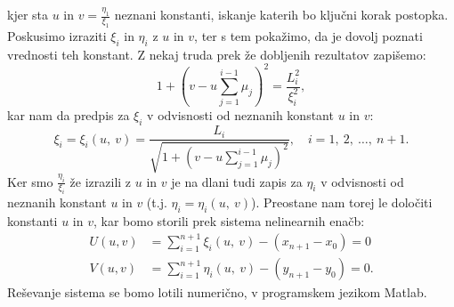 \documentclass{article}
\begin{document}
kjer sta $u$ in $v= \frac{\eta_{1}}{\xi_{1}}$ neznani konstanti, iskanje katerih bo ključni korak postopka. 
\newline
Poskusimo izraziti $\xi_{i}$ in $\eta_{i}$ z $u$ in $v$, ter s tem pokažimo, da je dovolj poznati vrednosti teh konstant.
\newline
Z nekaj truda prek že dobljenih rezultatov zapišemo:
$$
1+\left(v-u \sum_{j=1}^{i-1} \mu_{j}\right)^{2}=\frac{L_{i}^{2}}{\xi_{i}^{2}},
$$
kar nam da predpis za $\xi_{i}$ v odvisnosti od neznanih konstant $u$ in $v$:
$$
\xi_{i} = \xi_{i}(u,~v)=\frac{L_{i}}{\sqrt{1+\left(v-u \sum_{j=1}^{i-1} \mu_{j}\right)^{2}}}, \quad i=1,~2,~\ldots,~n+1.
$$
Ker smo $\frac{\eta_{i}}{\xi_{i}}$ že izrazili z $u$ in $v$ je na dlani tudi zapis za $\eta_{i}$ v odvisnosti od neznanih konstant $u$ in $v$ (t.j. $\eta_{i} = \eta_{i}(u,~v)$).
\newline
Preostane nam torej le določiti konstanti $u$ in $v$, kar bomo storili prek sistema nelinearnih enačb:
\begin{equation}
    \label{sistem}
    \begin{aligned}
    U(u, v) & =\sum_{i=1}^{n+1} \xi_{i}(u,~v)-\left(x_{n+1}-x_{0}\right) = 0\\
    V(u, v) & =\sum_{i=1}^{n+1} \eta_{i}(u,~v)-\left(y_{n+1}-y_{0}\right) = 0.
    \end{aligned}
\end{equation}
Reševanje sistema se bomo lotili numerično, v programskem jezikom Matlab.
\end{document}
